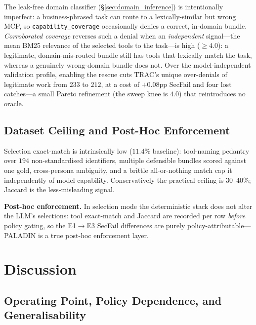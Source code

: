 \documentclass[sigconf,review,anonymous]{acmart}
\begin{document}
The leak-free domain classifier (\S\ref{sec:domain_inference}) is intentionally imperfect: a business-phrased task can route to a lexically-similar but wrong MCP, so \texttt{capability\_coverage} occasionally denies a correct, in-domain bundle. \emph{Corroborated coverage} reverses such a denial when an \emph{independent} signal---the mean BM25 relevance of the selected tools to the task---is high ($\geq\!4.0$): a legitimate, domain-mis-routed bundle still has tools that lexically match the task, whereas a genuinely wrong-domain bundle does not. Over the model-independent validation profile, enabling the rescue cuts TRAC's unique over-denials of legitimate work from $233$ to $212$, at a cost of $+0.08$pp SecFail and four lost catches---a small Pareto refinement (the sweep knee is $4.0$) that reintroduces no oracle.

\subsection{Dataset Ceiling and Post-Hoc Enforcement}
\label{sec:ceiling}

Selection exact-match is intrinsically low ($11.4\%$ baseline): tool-naming pedantry over $194$ non-standardised identifiers, multiple defensible bundles scored against one gold, cross-persona ambiguity, and a brittle all-or-nothing match cap it independently of model capability. Conservatively the practical ceiling is $30$--$40\%$; Jaccard is the less-misleading signal.

\textbf{Post-hoc enforcement.} In selection mode the deterministic stack does not alter the LLM's selections: tool exact-match and Jaccard are recorded per row \emph{before} policy gating, so the E1$\to$E3 SecFail differences are purely policy-attributable---PALADIN is a true post-hoc enforcement layer.

\FloatBarrier
\section{Discussion}
\label{sec:discussion}

\subsection{Operating Point, Policy Dependence, and Generalisability}
\label{sec:deployment_envelope}
\label{sec:policy_dependence}
\end{document}
